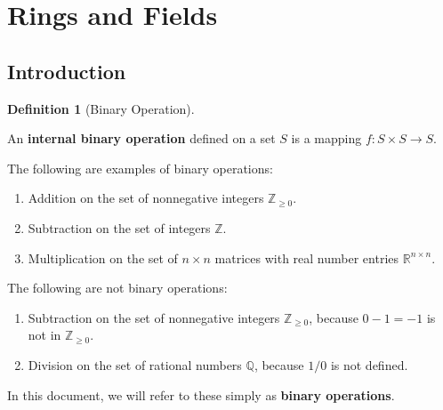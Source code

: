 \documentclass{scrartcl}
\theoremstyle{definition}
\newtheorem{definition}{Definition}[section]
\theoremstyle{plain}
\begin{document}
\section{Rings and Fields}

\subsection{Introduction}

\begin{definition}[Binary Operation]
    \label{def:binary operation}

    \newcommand{\Q}{\mathbb{Q}}
    \newcommand{\R}{\mathbb{R}}
    \newcommand{\Z}{\mathbb{Z}}

    An \textbf{internal binary operation} defined on a set $S$ is a mapping $f:S\times S\to S$.

    The following are examples of binary operations:
    \begin{enumerate}
        \item Addition on the set of nonnegative integers $\Z_{\geq 0}$.
        \item Subtraction on the set of integers $\Z$.
        \item Multiplication on the set of $n\times n$ matrices with real number entries $\R^{n\times n}$.
    \end{enumerate}

    The following are not binary operations:
    \begin{enumerate}
        \item Subtraction on the set of nonnegative integers $\Z_{\geq 0}$, because $0-1=-1$ is not in $\Z_{\geq 0}$.
        \item Division on the set of rational numbers $\Q$, because $1/0$ is not defined.
    \end{enumerate}

    In this document, we will refer to these simply as \textbf{binary operations}.
\end{definition}
\end{document}

